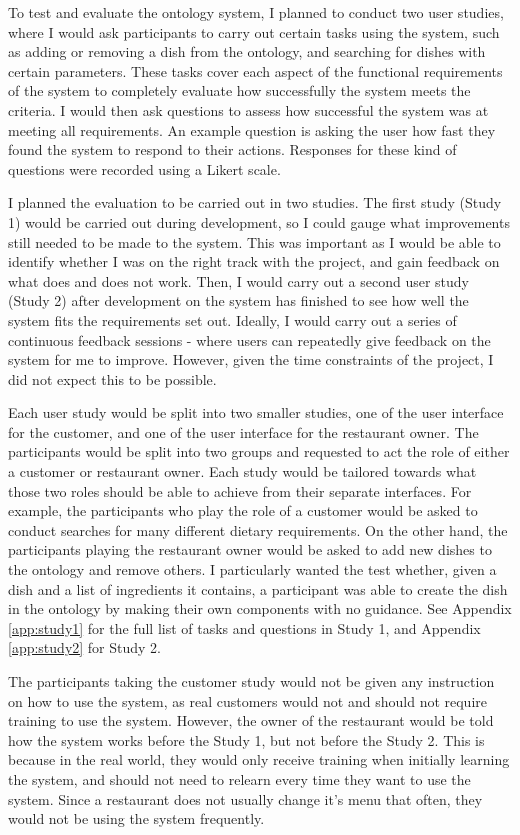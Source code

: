 To test and evaluate the ontology system, I planned to conduct two user studies, where I would ask participants to carry out certain tasks using the system, such as adding or removing a dish from the ontology, and searching for dishes with certain parameters. These tasks cover each aspect of the functional requirements of the system to completely evaluate how successfully the system meets the criteria. I would then ask questions to assess how successful the system was at meeting all requirements. An example question is asking the user how fast they found the system to respond to their actions. Responses for these kind of questions were recorded using a Likert scale.

I planned the evaluation to be carried out in two studies. The first study (Study 1) would be carried out during development, so I could gauge what improvements still needed to be made to the system. This was important as I would be able to identify whether I was on the right track with the project, and gain feedback on what does and does not work. Then, I would carry out a second user study (Study 2) after development on the system has finished to see how well the system fits the requirements set out. Ideally, I would carry out a series of continuous feedback sessions - where users can repeatedly give feedback on the system for me to improve. However, given the time constraints of the project, I did not expect this to be possible.

Each user study would be split into two smaller studies, one of the user interface for the customer, and one of the user interface for the restaurant owner. The participants would be split into two groups and requested to act the role of either a customer or restaurant owner. Each study would be tailored towards what those two roles should be able to achieve from their separate interfaces. For example, the participants who play the role of a customer would be asked to conduct searches for many different dietary requirements. On the other hand, the participants playing the restaurant owner would be asked to add new dishes to the ontology and remove others. I particularly wanted the test whether, given a dish and a list of ingredients it contains, a participant was able to create the dish in the ontology by making their own components with no guidance. See Appendix \ref{app:study1} for the full list of tasks and questions in Study 1, and Appendix \ref{app:study2} for Study 2.

The participants taking the customer study would not be given any instruction on how to use the system, as real customers would not and should not require training to use the system. However, the owner of the restaurant would be told how the system works before the Study 1, but not before the Study 2. This is because in the real world, they would only receive training when initially learning the system, and should not need to relearn every time they want to use the system. Since a restaurant does not usually change it's menu that often, they would not be using the system frequently.

